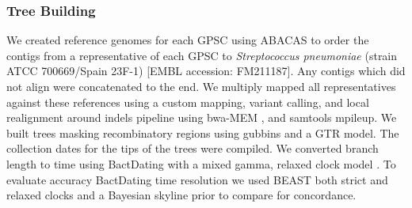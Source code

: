 \documentclass{article}
\begin{document}
\subsubsection{Tree Building}
We created reference genomes for each GPSC using ABACAS to order the contigs from a representative of each GPSC to \textit{Streptococcus pneumoniae }(strain ATCC 700669/Spain 23F-1) [EMBL accession: FM211187]\cite{assefaABACASAlgorithmbasedAutomatic2009}. Any contigs which did not align were concatenated to the end.  We multiply mapped all representatives against these references using a custom mapping, variant calling, and local realignment around indels pipeline using bwa-MEM \cite{liFastAccurateShort2009}, and samtools mpileup\cite{liFastAccurateShort2009}. We built trees masking recombinatory regions using gubbins\cite{croucherRapidPhylogeneticAnalysis2015} and a GTR model. The collection dates for the tips of the trees were compiled. We converted branch length to time using BactDating with a mixed gamma, relaxed clock model \cite{didelotBayesianInferenceAncestral2018}. To evaluate accuracy BactDating time resolution we used BEAST both strict and relaxed clocks and a Bayesian skyline prior to compare for concordance.
\end{document}
